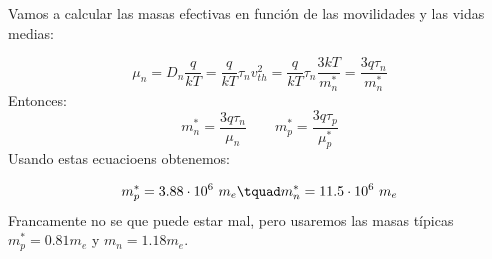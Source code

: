     Vamos a calcular las masas efectivas en función de las movilidades y las vidas medias:

    \begin{equation}
        \mu_n = D_n \frac{q}{kT} = \frac{q}{kT} \tau_n v^2_{th} = \frac{q}{kT} \tau_n \frac{3kT}{m_n^*} = \frac{3q\tau_n}{m_n^*}
    \end{equation}
    Entonces:
    \begin{equation}
        m_n^* = \frac{3q\tau_n}{\mu_n} \qquad m_p^* = \frac{3q\tau_p}{\mu_p^*}
    \end{equation}
    Usando estas ecuacioens obtenemos:

    \begin{equation}
        m_p^* = 3.88 \cdot 10^6 \ m_e \tquad m_n^* = 11.5 \cdot 10^6 \ m_e
    \end{equation}
    Francamente no se que puede estar mal, pero usaremos las masas típicas $m_p^* = 0.81m_e$ y $m_n=1.18 m_e$.
